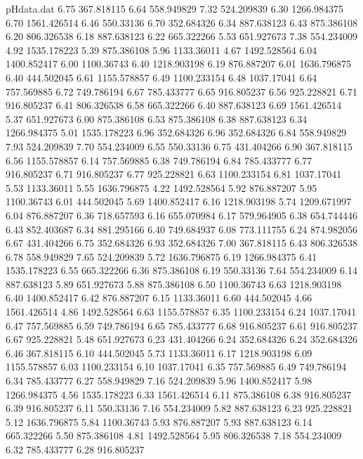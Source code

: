 \begin{filecontents}{pHdata.dat}
6.75 	367.818115
6.64 	558.949829
7.32 	524.209839
6.30 	1266.984375
6.70 	1561.426514
6.46 	550.33136
6.70 	352.684326
6.34 	887.638123
6.43 	875.386108
6.20 	806.326538
6.18 	887.638123
6.22 	665.322266
5.53 	651.927673
7.38 	554.234009
4.92 	1535.178223
5.39 	875.386108
5.96 	1133.36011
4.67 	1492.528564
6.04 	1400.852417
6.00 	1100.36743
6.40 	1218.903198
6.19 	876.887207
6.01 	1636.796875
6.40 	444.502045
6.61 	1155.578857
6.49 	1100.233154
6.48 	1037.17041
6.64 	757.569885
6.72 	749.786194
6.67 	785.433777
6.65 	916.805237
6.56 	925.228821
6.71 	916.805237
6.41 	806.326538
6.58 	665.322266
6.40 	887.638123
6.69 	1561.426514
5.37 	651.927673
6.00 	875.386108
6.53 	875.386108
6.38 	887.638123
6.34 	1266.984375
5.01 	1535.178223
6.96 	352.684326
6.96 	352.684326
6.84 	558.949829
7.93 	524.209839
7.70 	554.234009
6.55 	550.33136
6.75 	431.404266
6.90 	367.818115
6.56 	1155.578857
6.14 	757.569885
6.38 	749.786194
6.84 	785.433777
6.77 	916.805237
6.71 	916.805237
6.77 	925.228821
6.63 	1100.233154
6.81 	1037.17041
5.53 	1133.36011
5.55 	1636.796875
4.22 	1492.528564
5.92 	876.887207
5.95 	1100.36743
6.01 	444.502045
5.69 	1400.852417
6.16 	1218.903198
5.74 	1209.671997
6.04 	876.887207
6.36 	718.657593
6.16 	655.070984
6.17 	579.964905
6.38 	654.744446
6.43 	852.403687
6.34 	881.295166
6.40 	749.684937
6.08 	773.111755
6.24 	874.982056
6.67 	431.404266
6.75 	352.684326
6.93 	352.684326
7.00 	367.818115
6.43 	806.326538
6.78 	558.949829
7.65 	524.209839
5.72 	1636.796875
6.19 	1266.984375
6.41 	1535.178223
6.55 	665.322266
6.36 	875.386108
6.19 	550.33136
7.64 	554.234009
6.14 	887.638123
5.89 	651.927673
5.88 	875.386108
6.50 	1100.36743
6.63 	1218.903198
6.40 	1400.852417
6.42 	876.887207
6.15 	1133.36011
6.60 	444.502045
4.66 	1561.426514
4.86 	1492.528564
6.63 	1155.578857
6.35 	1100.233154
6.24 	1037.17041
6.47 	757.569885
6.59 	749.786194
6.65 	785.433777
6.68 	916.805237
6.61 	916.805237
6.67 	925.228821
5.48 	651.927673
6.23 	431.404266
6.24 	352.684326
6.24 	352.684326
6.46 	367.818115
6.10 	444.502045
5.73 	1133.36011
6.17 	1218.903198
6.09 	1155.578857
6.03 	1100.233154
6.10 	1037.17041
6.35 	757.569885
6.49 	749.786194
6.34 	785.433777
6.27 	558.949829
7.16 	524.209839
5.96 	1400.852417
5.98 	1266.984375
4.56 	1535.178223
6.33 	1561.426514
6.11 	875.386108
6.38 	916.805237
6.39 	916.805237
6.11 	550.33136
7.16 	554.234009
5.82 	887.638123
6.23 	925.228821
5.12 	1636.796875
5.84 	1100.36743
5.93 	876.887207
5.93 	887.638123
6.14 	665.322266
5.50 	875.386108
4.81 	1492.528564
5.95 	806.326538
7.18 	554.234009
6.32 	785.433777
6.28 	916.805237

\end{filecontents}
